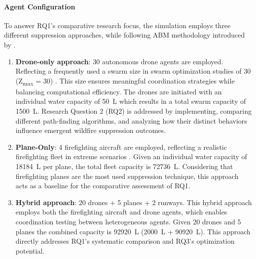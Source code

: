 \documentclass[11pt, a4paper]{article}
\begin{document}
\paragraph{Agent Configuration} To answer RQ1's comparative research focus, the simulation employs three different suppression approaches, while following ABM methodology introduced by \citet*{wilensky2015introduction}.
\begin{enumerate}
  \item \textbf{Drone-only approach}: 30 autonomous drone agents are employed. Reflecting a frequently used a swarm size in swarm optimization studies of 30 (Z\textsubscript{max} = 30) \citep{swarm1_kozlov2022information,swarm2_optimization_drone}. This size ensures meaningful coordination strategies while balancing computational efficiency. The drones are initiated with an individual water capacity of \SI{50}{\liter} which results in a total swarm capacity of \SI{1500}{\liter}. Research Question 2 (RQ2) is addressed by implementing, comparing different path-finding algorithms, and analyzing how their distinct behaviors influence emergent wildfire suppression outcomes.
  \item \textbf{Plane-Only}: 4 firefighting aircraft are employed, reflecting a realistic firefighting fleet in extreme scenarios \citep{sherryAerialFireFighting2025}. Given an individual water capacity of \SI{18184}{\liter} per plane, the total fleet capacity is \SI{72736}{\liter}. Considering that firefighting planes are the most used suppression technique, this approach acts as a baseline for the comparative assessment of RQ1.
  \item \textbf{Hybrid approach}: 20 drones + 5 planes + 2 runways. This hybrid approach employs both the firefighting aircraft and drone agents, which enables coordination testing between heterogeneous agents. Given 20 drones and 5 planes the combined capacity is \SI{92920}{\liter} (\SI{2000}{\liter} + \SI{90920}{\liter}). This approach directly addresses RQ1's systematic comparison and RQ3's optimization potential. 
\end{enumerate}
\end{document}
